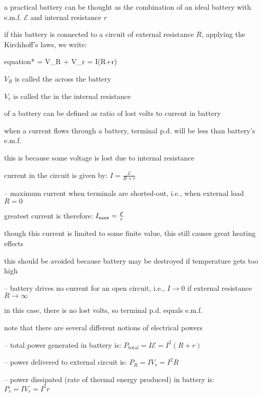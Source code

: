 a practical battery can be thought as the combination of an ideal battery with e.m.f. $\mathcal{E}$ and internal resistance $r$

if this battery is connected to a circuit of external resistance $R$, applying the Kirchhoff's laws, we write:

{
	\centering
	
	\begin{empheq}[box=\tcbhighmath]{equation*}{ = V_R + V_r = I(R+r)}\end{empheq}
	
}

$V_R$ is called the  across the battery

$V_r$ is called the  in the internal resistance

\cmt {} of a battery can be defined as ratio of lost volts to current in battery

\cmt when a current flows through a battery, terminal p.d. will be less than battery's e.m.f.

this is because some voltage is lost due to internal resistance


\cmt current in the circuit is given by: $I = \frac{\mathcal{E}}{R+r}$

\begin{compactitem}
	\item[--] maximum current when terminals are shorted-out, i.e., when external load $R=0$
	
	greatest current is therefore: $I_{\text{max}} = \frac{\mathcal{E}}{r}$
	
	though this current is limited to some finite value, this still causes great heating effects
	
	this should be avoided because battery may be destroyed if temperature gets too high
	
	\item[--] battery drives no current for an open circuit, i.e., $I \to 0$ if external resistance $R \to \infty$
	
	in this case, there is no lost volts, so terminal p.d. equals e.m.f.
\end{compactitem}

\cmt note that there are several different notions of electrical powers

\begin{compactitem}
	\item[--] total power generated in battery is: $P_\text{total} = I\mathcal{E} = I^2 (R+r)$

	\item[--] power delivered to external circuit is: $P_R = I V_r = I^2 R$

	\item[--] power dissipated (rate of thermal energy produced) in battery is: $P_r = I V_r = I^2 r$
\end{compactitem}

